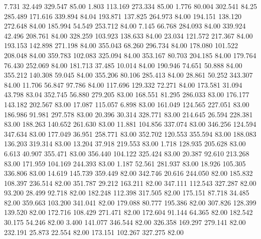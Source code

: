    7.731   32.449  329.547        85.00
   1.803  113.169  273.334        85.00
   1.776   80.004  302.541        84.25
 285.489  171.616  339.894        84.04
 193.871  137.825  264.973        84.00
 194.151  138.120  272.648        84.00
 185.994   54.549  253.712        84.00
   7.145   66.768  284.093        84.00
 339.924   42.496  208.761        84.00
 328.259  103.923  138.633        84.00
  23.034  121.572  217.367        84.00
 193.153  142.898  271.198        84.00
 355.043   68.260  296.734        84.00
 178.080  101.522  208.048        84.00
 359.783  102.083  325.094        84.00
 353.167   80.703  204.185        84.00
 179.764   76.430  252.069        84.00
 181.713   37.485   10.014        84.00
 190.946   74.651   50.888        84.00
 355.212  140.308   59.045        84.00
 355.206   80.106  285.413        84.00
  28.861   50.252  343.307        84.00
  11.706   56.847   97.786        84.00
 117.696  129.332   72.271        84.00
 173.581   31.094   43.798        83.04
 352.745   56.880  279.205        83.00
 168.551   81.295  286.033        83.00
 176.177  143.182  202.567        83.00
  17.087  115.057    6.898        83.00
 161.049  124.565  227.051        83.00
 186.986   91.981  297.578        83.00
  20.396   30.314  328.771        83.00
 214.645   26.594  228.381        83.00
 188.263  140.652  261.630        83.00
  11.881  104.856  337.074        83.00
 346.256  124.594  347.634        83.00
 177.049   36.951  258.771        83.00
 352.702  120.553  355.594        83.00
 188.083  136.203  319.314        83.00
  13.204   37.918  219.553        83.00
   1.718  128.935  205.628        83.00
   6.613   40.907  355.471        83.00
 356.440  104.122  325.424        83.00
  20.387   92.610  213.268        83.00
 171.959  104.169  244.393        83.00
   1.187   52.561  281.937        83.00
  18.926  105.305  336.806        83.00
  14.619  145.739  359.449        82.00
 342.746   20.616  244.050        82.00
 185.832  108.397  236.514        82.00
 351.787   29.212  163.211        82.00
 347.111  112.543  327.287        82.00
  93.200   28.499   92.718        82.00
 182.248  112.398  317.505        82.00
 175.151   87.718   34.485        82.00
 359.663  103.200  341.041        82.00
 179.088   80.777  195.386        82.00
 307.826  128.399  139.520        82.00
 172.716  108.429  271.471        82.00
 172.604   91.144   64.365        82.00
 182.542   30.175   54.246        82.00
   3.400  141.077  346.544        82.00
 326.358  169.297  279.141        82.00
 232.191   25.873   22.554        82.00
 173.151  102.267  327.275        82.00
